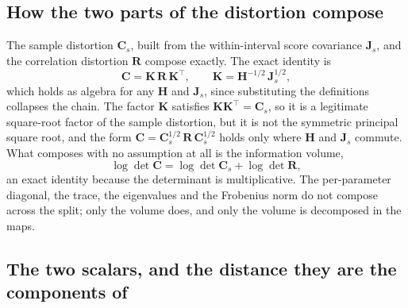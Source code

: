 \begin{appendixbox}
\subsection*{How the two parts of the distortion compose}

The sample distortion $\mathbf{C}_s$, built from the within-interval score covariance
$\mathbf{J}_s$, and the correlation distortion $\mathbf{R}$ compose exactly. The exact identity is
\[ \mathbf{C}=\mathbf{K}\,\mathbf{R}\,\mathbf{K}^\top,\qquad \mathbf{K}=\mathbf{H}^{-1/2}\,\mathbf{J}_s^{1/2}, \]
which holds as algebra for any $\mathbf{H}$ and $\mathbf{J}_s$, since substituting the definitions collapses the chain. The factor $\mathbf{K}$ satisfies $\mathbf{K}\mathbf{K}^\top=\mathbf{C}_s$, so it is a legitimate square-root factor of the sample distortion, but it is not the symmetric principal square root, and the form $\mathbf{C}=\mathbf{C}_s^{1/2}\,\mathbf{R}\,\mathbf{C}_s^{1/2}$ holds only where $\mathbf{H}$ and $\mathbf{J}_s$ commute. What composes with no assumption at all is the information volume,
\[ \log\det\mathbf{C}=\log\det\mathbf{C}_s+\log\det\mathbf{R}, \]
an exact identity because the determinant is multiplicative. The per-parameter diagonal, the trace, the eigenvalues and the Frobenius norm do not compose across the split; only the volume does, and only the volume is decomposed in the maps.

\subsection*{The two scalars, and the distance they are the components of}


\end{appendixbox}

